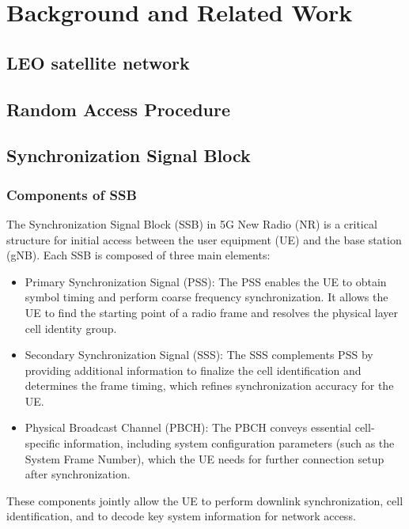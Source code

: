 \chapter{Background and Related Work}
\label{chap:background}


\section{LEO satellite network}

\section{Random Access Procedure}
\section{Synchronization Signal Block}
\subsection{Components of SSB}
The Synchronization Signal Block (SSB) in 5G New Radio (NR) is a critical structure for initial access between the user equipment (UE) and the base station (gNB). Each SSB is composed of three main elements:
\begin{itemize}
    \item Primary Synchronization Signal (PSS): The PSS enables the UE to obtain symbol timing and perform coarse frequency synchronization. It allows the UE to find the starting point of a radio frame and resolves the physical layer cell identity group.
    \item Secondary Synchronization Signal (SSS): The SSS complements PSS by providing additional information to finalize the cell identification and determines the frame timing, which refines synchronization accuracy for the UE.
    \item Physical Broadcast Channel (PBCH): The PBCH conveys essential cell-specific information, including system configuration parameters (such as the System Frame Number), which the UE needs for further connection setup after synchronization.
\end{itemize}
These components jointly allow the UE to perform downlink synchronization, cell identification, and to decode key system information for network access.

